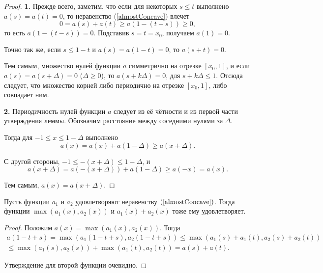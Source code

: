 \begin{proof}
\textbf{1.}
Прежде всего, заметим, что если для некоторых $s \le t$ выполнено $a(s) = a(t) = 0$,
то неравенство (\ref{almostConcave}) влечет
$$
0 = a(s) + a(t) \ge a(1 - (t - s)) \ge 0,
$$
то есть $a(1 - (t - s)) = 0$.
Подставив $s = t = x_0$, получаем $a(1) = 0$.

Точно так же, если $s \le 1 - t$ и $a(s) = a(1 - t) = 0$, то $a(s + t) = 0$.

Тем самым, множество нулей функции $a$ симметрично на отрезке $[x_0, 1]$,
и если $a(s) = a(s + \Delta) = 0$ ($\Delta \ge 0$),
то $a(s + k\Delta) = 0$, для $s + k\Delta \le 1$.
Отсюда следует, что множество корней либо периодично на отрезке $[x_0, 1]$, либо совпадает ним.

\textbf{2.}
Периодичность нулей функции $a$ следует из её чётности и из первой части утверждения леммы.
Обозначим расстояние между соседними нулями за $\Delta$.

Тогда для $-1 \le x \le 1 - \Delta$ выполнено
$$
a(x) = a(x) + a(1 - \Delta) \ge a(x + \Delta).
$$

С другой стороны, $-1 \le -(x + \Delta) \le 1 - \Delta$, и
$$
a(x + \Delta) = a(-(x + \Delta)) + a(1 - \Delta) \ge a(-x) = a(x).
$$

Тем самым, $a(x) = a(x + \Delta)$.
\end{proof}

\begin{lm}
\label{maxSumConcave}
Пусть функции $a_1$ и $a_2$ удовлетворяют неравенству $(\ref{almostConcave})$.
Тогда функции $\max (a_1(x), a_2(x))$ и $a_1(x) + a_2(x)$ тоже ему удовлетворяет.
\end{lm}
\begin{proof}
Положим $a(x) = \max (a_1(x), a_2(x))$.
Тогда
\begin{multline*}
a(1 - t + s) = \max(a_1( 1 - t + s), a_2(1 - t + s)) \le
\max(a_1(s) + a_1(t), a_2(s) + a_2(t)) \\
\le \max(a_1(s), a_2(s)) + \max(a_1(t), a_2(t)) =
a(s) + a(t).
\end{multline*}

Утверждение для второй функции очевидно.
\end{proof}

